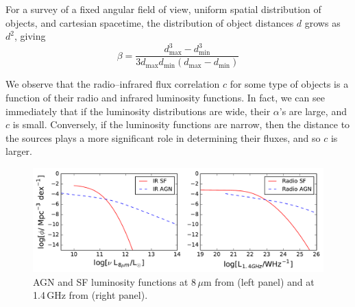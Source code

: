 \documentclass[numberedappendix]{emulateapj}
\newcommand{\mintext}{\text{min}}
\newcommand{\maxtext}{\text{max}}
\begin{document}
For a survey of a fixed angular field of view, uniform spatial distribution of objects, and cartesian spacetime, the distribution of object distances $d$ grows as $d^2$, giving 
\begin{equation}
	\beta=\frac{d_\maxtext^3-d_\mintext^3}{3d_\maxtext d_\mintext (d_\maxtext-d_\mintext)}
\end{equation}

We observe that the radio--infrared flux correlation $c$ for some type of objects is a function of their radio and infrared luminosity functions. In fact, we can see immediately that if the luminosity distributions are wide, their $\alpha$'s are large, and $c$ is small. Conversely, if the luminosity functions are narrow, then the distance to the sources plays a more significant role in determining their fluxes, and so $c$ is larger. 

\begin{figure}[h]
\centering
\includegraphics[width=6in]{sim_rad_ir_luminosity_functions.pdf}
\caption[AGN and SF luminosity functions at 8\,$\mu$m from (left) and at 1.4\,GHz (right).]{AGN and SF luminosity functions at 8\,$\mu$m from \citet{fu10} (left panel) and at 1.4\,GHz from \citet{mauch07} (right panel).}
\label{fig:luminosityfunctions}
\end{figure}
\end{document}
